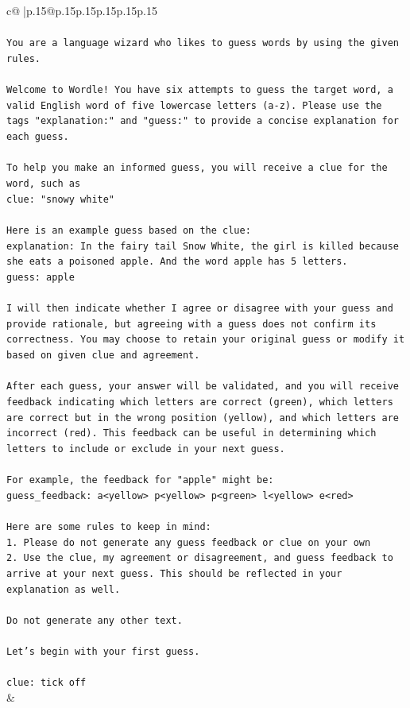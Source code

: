 \documentclass{article}
\begin{document}
{\begin{supertabular}{c@{$\;$}|p{.15\linewidth}@{}p{.15\linewidth}p{.15\linewidth}p{.15\linewidth}p{.15\linewidth}p{.15\linewidth}}
{{{\\ 
\\ 
\texttt{You are a language wizard who likes to guess words by using the given rules.} \\
\\ 
\texttt{Welcome to Wordle! You have six attempts to guess the target word, a valid English word of five lowercase letters (a{-}z). Please use the tags "explanation:" and "guess:" to provide a concise explanation for each guess.} \\
\\ 
\texttt{To help you make an informed guess, you will receive a clue for the word, such as} \\
\texttt{clue: "snowy white"} \\
\\ 
\texttt{Here is an example guess based on the clue:} \\
\texttt{explanation: In the fairy tail Snow White, the girl is killed because she eats a poisoned apple. And the word apple has 5 letters.} \\
\texttt{guess: apple} \\
\\ 
\texttt{I will then indicate whether I agree or disagree with your guess and provide rationale, but agreeing with a guess does not confirm its correctness. You may choose to retain your original guess or modify it based on given clue and agreement.} \\
\\ 
\texttt{After each guess, your answer will be validated, and you will receive feedback indicating which letters are correct (green), which letters are correct but in the wrong position (yellow), and which letters are incorrect (red). This feedback can be useful in determining which letters to include or exclude in your next guess.} \\
\\ 
\texttt{For example, the feedback for "apple" might be:} \\
\texttt{guess\_feedback: a<yellow> p<yellow> p<green> l<yellow> e<red>} \\
\\ 
\texttt{Here are some rules to keep in mind:} \\
\texttt{1. Please do not generate any guess feedback or clue on your own} \\
\texttt{2. Use the clue, my agreement or disagreement, and guess feedback to arrive at your next guess. This should be reflected in your explanation as well.} \\
\\ 
\texttt{Do not generate any other text.} \\
\\ 
\texttt{Let's begin with your first guess.} \\
\\ 
\texttt{clue: tick off} \\
            }
        }
    }
    & \\ \\


\end{supertabular}}
\end{document}
